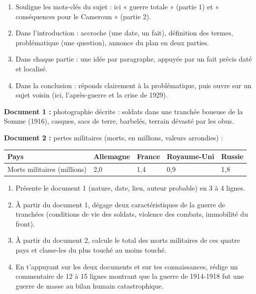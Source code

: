 \documentclass[11pt]{article}
\begin{document}
\begin{methode}
\begin{enumerate}
\item Souligne les mots-clés du sujet : ici « guerre totale » (partie 1) et « conséquences pour le Cameroun » (partie 2).
\item Dans l'introduction : accroche (une date, un fait), définition des termes, problématique (une question), annonce du plan en deux parties.
\item Dans chaque partie : une idée par paragraphe, appuyée par un fait précis daté et localisé.
\item Dans la conclusion : réponds clairement à la problématique, puis ouvre sur un sujet voisin (ici, l'après-guerre et la crise de 1929).
\end{enumerate}
\end{methode}

\begin{exercice}
\textbf{Document 1 :} photographie décrite : soldats dans une tranchée boueuse de la Somme (1916), casques, sacs de terre, barbelés, terrain dévasté par les obus.

\textbf{Document 2 :} pertes militaires (morts, en millions, valeurs arrondies) :
\begin{center}
\begin{tabularx}{\linewidth}{|l|X|X|X|X|}
\hline
\rowcolor{popblueL} Pays & Allemagne & France & Royaume-Uni & Russie \\
\hline
Morts militaires (millions) & 2,0 & 1,4 & 0,9 & 1,8 \\
\hline
\end{tabularx}
\end{center}
\begin{enumerate}
\item Présente le document 1 (nature, date, lieu, auteur probable) en 3 à 4 lignes.
\item À partir du document 1, dégage deux caractéristiques de la guerre de tranchées (conditions de vie des soldats, violence des combats, immobilité du front).
\item À partir du document 2, calcule le total des morts militaires de ces quatre pays et classe-les du plus touché au moins touché.
\item En t'appuyant sur les deux documents et sur tes connaissances, rédige un commentaire de 12 à 15 lignes montrant que la guerre de 1914-1918 fut une guerre de masse au bilan humain catastrophique.
\end{enumerate}
\end{exercice}
\end{document}
